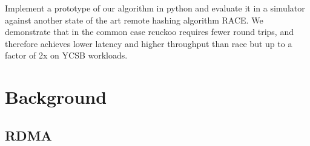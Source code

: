 Implement a prototype of our algorithm in python and
evaluate it in a simulator against another state of the art
remote hashing algorithm RACE. We demonstrate that in the
common case rcuckoo requires fewer round trips, and
therefore achieves lower latency and higher throughput than
race but up to a factor of 2x on YCSB workloads.



\section{Background}
\label{sec:background}

\subsection{RDMA}

